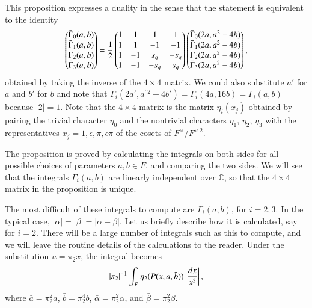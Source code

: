 \documentclass{amsart}
\newcommand\leftd[1]{\left | {d#1\over #1^2}\right |}
\newcommand\leftdx{\leftd x}
\newcommand\bGamma{\bar\Gamma}
\begin{document}
This proposition expresses a duality in the sense that the statement
is equivalent to the identity
$$\begin{pmatrix}\bGamma_0(a,b) \\
          \bGamma_1(a,b) \\
          \bGamma_2(a,b) \\
          \bGamma_3(a,b) \end{pmatrix}
= {1\over 2}
\begin{pmatrix}1&1&1&1\\
        1&1&-1&-1\\
        1&-1&s_q&-s_q\\
        1&-1&-s_q&s_q\end{pmatrix}
\begin{pmatrix}\bGamma_0(2a,a^2-4b)\\
        \bGamma_1(2a,a^2-4b)\\
        \bGamma_2(2a,a^2-4b)\\
        \bGamma_3(2a,a^2-4b)\end{pmatrix},
$$
obtained by taking the inverse of the $4\times 4$ matrix.  We could
also substitute $a'$ for $a$ and $b'$ for $b$ and note that
$\bGamma_i(2a',a^{\prime\,2} - 4b') = \bGamma_i(4a,16b) = \bGamma_i(a,b)$
because $|2|=1$. Note that the $4\times 4$ matrix is the
matrix $\eta_i(x_j)$ obtained by pairing the trivial character
$\eta_0$ and the nontrivial characters
$\eta_1$, $\eta_2$, $\eta_3$ with the
representatives $x_j = 1,\epsilon,\pi,\epsilon\pi$
of the cosets of $F^\times/F^{\times\,2}$.


The proposition is
proved by calculating the integrals on both sides for all possible
choices of parameters $a,b\in F$, and comparing the two sides.
We will see that the integrals $\bGamma_i(a,b)$ are linearly
independent over ${\mathbb C}$, so that the $4\times4$ matrix in
the proposition is unique.

The most difficult of these integrals to compute are $\Gamma_i(a,b)$,
for $i=2,3$.  In the typical case, $|\alpha|=|\beta|=|\alpha-\beta|$.
Let us briefly describe how it is calculated, say for $i=2$.  There
will be a large number of integrals such as this to compute, and
we will leave the routine details of the calculations to the reader.
Under the substitution $u=\pi_2x$, the
integral becomes
$$|\pi_2|^{-1}\int_{F}\eta_2(P(x,\bar a,\bar b))\leftdx,$$
where $\bar a = \pi_2^{2} a$, $\bar b = \pi_2^{4} b$, $\bar \alpha
=\pi_2^{2} \alpha$, and $\bar \beta = \pi_2^{2}\beta$.
\end{document}
